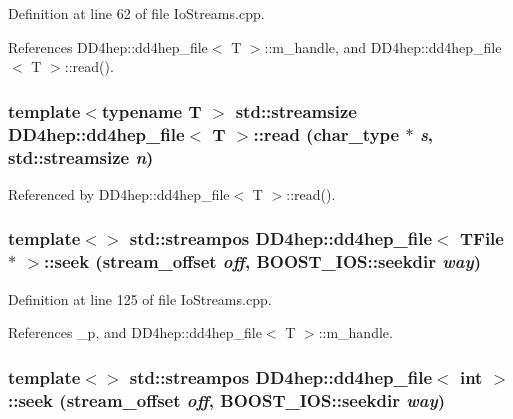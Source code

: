 Definition at line 62 of file IoStreams.cpp.

References DD4hep::dd4hep\_\-file$<$ T $>$::m\_\-handle, and DD4hep::dd4hep\_\-file$<$ T $>$::read().\hypertarget{class_d_d4hep_1_1dd4hep__file_a3becd552128a6306644b5ff9bd19c493}{
\subsubsection[{read}]{\setlength{\rightskip}{0pt plus 5cm}template$<$typename T $>$ std::streamsize {\bf DD4hep::dd4hep\_\-file}$<$ {\bf T} $>$::read ({\bf char\_\-type} $\ast$ {\em s}, \/  std::streamsize {\em n})}}
\label{class_d_d4hep_1_1dd4hep__file_a3becd552128a6306644b5ff9bd19c493}


Referenced by DD4hep::dd4hep\_\-file$<$ T $>$::read().\hypertarget{class_d_d4hep_1_1dd4hep__file_afcc295b107f64a56443fa949df98c80d}{
\subsubsection[{seek}]{\setlength{\rightskip}{0pt plus 5cm}template$<$$>$ std::streampos {\bf DD4hep::dd4hep\_\-file}$<$ TFile $\ast$ $>$::seek ({\bf stream\_\-offset} {\em off}, \/  BOOST\_\-IOS::seekdir {\em way})}}
\label{class_d_d4hep_1_1dd4hep__file_afcc295b107f64a56443fa949df98c80d}


Definition at line 125 of file IoStreams.cpp.

References \_\-p, and DD4hep::dd4hep\_\-file$<$ T $>$::m\_\-handle.\hypertarget{class_d_d4hep_1_1dd4hep__file_a618d7b57c1fd892fa35ab82d1cf4cab5}{
\subsubsection[{seek}]{\setlength{\rightskip}{0pt plus 5cm}template$<$$>$ std::streampos {\bf DD4hep::dd4hep\_\-file}$<$ int $>$::seek ({\bf stream\_\-offset} {\em off}, \/  BOOST\_\-IOS::seekdir {\em way})}}
\label{class_d_d4hep_1_1dd4hep__file_a618d7b57c1fd892fa35ab82d1cf4cab5}


